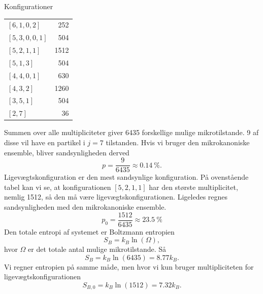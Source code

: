 \begin{opgave}{Konfigurationer}
\begin{table}[H]
\begin{tabular}{lr}
            $[6,1,0,2]$ & 252\\
            $[5,3,0,0,1]$ & 504\\
            $[5,2,1,1]$ & 1512\\
            $[5,1,3]$ & 504\\
            $[4,4,0,1]$ & 630\\
            $[4,3,2]$ & 1260\\
            $[3,5,1]$ & 504\\
            $[2,7]$ & 36
        \end{tabular}
    \end{table}
    Summen over alle multipliciteter giver 6435 forskellige mulige mikrotilstande. 9 af disse vil have en partikel i $j=7$ tilstanden. Hvis vi bruger den mikrokanoniske ensemble, bliver sandsynligheden derved
    \[ p=\frac{9}{6435}\approx \SI{0.14}{\percent}. \]
    \opg Ligevægtskonfiguration er den mest sandsynlige konfiguration. På ovenstående tabel kan vi se, at konfigurationen $[5,2,1,1]$ har den største multiplicitet, nemlig 1512, så den må være ligevægtskonfigurationen. Ligeledes regnes sandsynligheden med den mikrokanoniske ensemble.
    \[ p_0=\frac{1512}{6435}\approx \SI{23.5}{\percent} \]
    \opg Den totale entropi af systemet er Boltzmann entropien
    \[ S_B=k_B\ln(\Omega), \]
    hvor $\Omega$ er det totale antal mulige mikrotilstande. Så
    \[ S_B=k_B\ln(6435)=8.77k_B. \]
    \opg Vi regner entropien på samme måde, men hvor vi kun bruger multipliciteten for ligevægtskonfigurationen
    \[ S_{B,0}=k_B\ln(1512)=7.32k_B. \]
\end{opgave}

